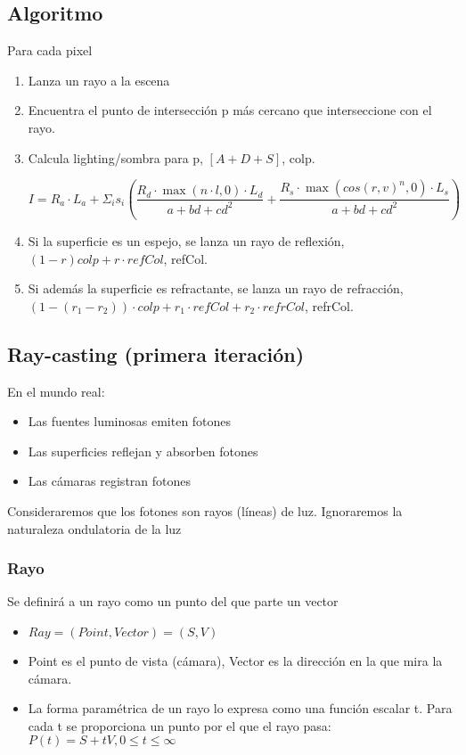 \subsection{Algoritmo}
Para cada pixel
\begin{enumerate}
    \item Lanza un rayo a la escena
    \item Encuentra el punto de intersección p más cercano que interseccione con el rayo.
    \item Calcula lighting/sombra para p, $[A+D+S]$, colp.
        
    $$I= R_a \cdot L_a + \Sigma_i s_i \left( \frac {R_d \cdot \max (n\cdot l,0) \cdot L_d}{a+bd+cd^2} + \frac {R_s \cdot \max (cos(r,v)^n,0) \cdot L_s}{a+bd+cd^2} \right)$$
    \item Si la superficie es un espejo, se lanza un rayo de reflexión, $(1-r)colp+ r\cdot refCol$, refCol.
    \item Si además la superficie es refractante, se lanza un rayo de refracción, $(1-(r_1-r_2))\cdot colp + r_1\cdot refCol +r_2\cdot refrCol$, refrCol.
\end{enumerate}
\subsection{Ray-casting (primera iteración)}
En el mundo real:
\begin{itemize}
    \item Las fuentes luminosas emiten fotones
    \item Las superficies reflejan y absorben fotones
    \item Las cámaras registran fotones
\end{itemize}

Consideraremos que los fotones son rayos (líneas) de luz. Ignoraremos la naturaleza ondulatoria de la luz

\subsubsection{Rayo}
Se definirá a un rayo como un punto del que parte un vector
\begin{itemize}
    \item $Ray = (Point, Vector) = (S, V)$
    \item Point es el punto de vista (cámara), Vector es la dirección en la que mira la cámara.
    \item La forma paramétrica de un rayo lo expresa como una función escalar t. Para cada t se proporciona un punto por el que el rayo pasa: $P(t)=S+tV, 0 \leq t \leq \infty$
\end{itemize}

